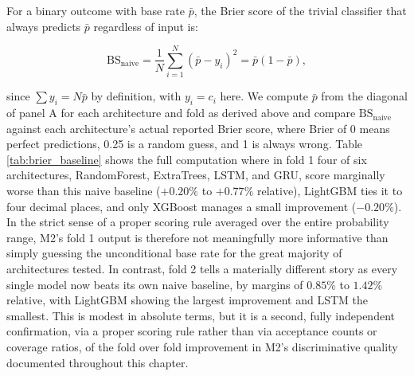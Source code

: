 \documentclass[12pt, a4paper]{article}
\begin{document}
\medskip

For a binary outcome with base rate $\bar p$, the Brier score of the trivial classifier that always predicts $\bar p$ regardless of input is:

\begin{equation}
\text{BS}_{\text{naive}} = \frac{1}{N}\sum_{i=1}^{N} (\bar p - y_i)^2 = \bar p(1-\bar p),
\label{eq:naive_brier}
\end{equation}

since $\sum y_i = N\bar p$ by definition, with $y_i = c_i$ here. We compute $\bar p$ from the diagonal of panel A for each architecture and fold as derived above and compare 
$\text{BS}_{\text{naive}}$ against each architecture's actual reported Brier score, where Brier of 0 means perfect predictions, 0.25 is a random guess, and 1 is always wrong. 
Table \ref{tab:brier_baseline} shows the full computation where in fold 1 four of six architectures, RandomForest, ExtraTrees, LSTM, and GRU, score marginally worse than this 
naive baseline ($+0.20\%$ to $+0.77\%$ relative), LightGBM ties it to four decimal places, and only XGBoost manages a small improvement ($-0.20\%$). 
In the strict sense of a proper scoring rule averaged over the entire probability range, M2's fold 1 output is therefore not meaningfully more informative than simply guessing 
the unconditional base rate for the great majority of architectures tested.
In contrast, fold 2 tells a materially different story as every single model now beats its own naive baseline, by margins of $0.85\%$ to $1.42\%$ relative, with LightGBM showing 
the largest improvement and LSTM the smallest. This is modest in absolute terms, but it is a second, fully independent confirmation, via a proper scoring rule rather than 
via acceptance counts or coverage ratios, of the fold over fold improvement in M2's discriminative quality documented throughout this chapter.
\end{document}
